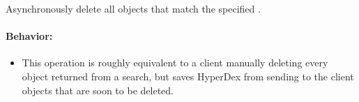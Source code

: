 Asynchronously delete all objects that match the specified .

\paragraph{Behavior:}
\begin{itemize}[noitemsep]
\item This operation is roughly equivalent to a client manually deleting every
    object returned from a search, but saves HyperDex from sending to the client
    objects that are soon to be deleted.
\end{itemize}
